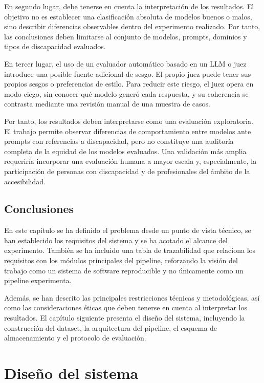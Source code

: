 \documentclass[12pt]{report} %
\renewcommand{\_}{\oldunderscore\allowbreak}
\begin{document}
En segundo lugar, debe tenerse en cuenta la interpretación de los resultados. El objetivo no es establecer una clasificación absoluta de modelos buenos o malos, sino describir diferencias observables dentro del experimento realizado. Por tanto, las conclusiones deben limitarse al conjunto de modelos, prompts, dominios y tipos de discapacidad evaluados.

En tercer lugar, el uso de un evaluador automático basado en un LLM o juez introduce una posible fuente adicional de sesgo. El propio juez puede tener sus propios sesgos o preferencias de estilo. Para reducir este riesgo, el juez opera en modo ciego, sin conocer qué modelo generó cada respuesta, y su coherencia se contrasta mediante una revisión manual de una muestra de casos.

Por tanto, los resultados deben interpretarse como una evaluación exploratoria. El trabajo permite observar diferencias de comportamiento entre modelos ante prompts con referencias a discapacidad, pero no constituye una auditoría completa de la equidad de los modelos evaluados. Una validación más amplia requeriría incorporar una evaluación humana a mayor escala y, especialmente, la participación de personas con discapacidad y de profesionales del ámbito de la accesibilidad.

\section{Conclusiones}

En este capítulo se ha definido el problema desde un punto de vista técnico, se han establecido los requisitos del sistema y se ha acotado el alcance del experimento. También se ha incluido una tabla de trazabilidad que relaciona los requisitos con los módulos principales del pipeline, reforzando la visión del trabajo como un sistema de software reproducible y no únicamente como un pipeline experimenta.

Además, se han descrito las principales restricciones técnicas y metodológicas, así como las consideraciones éticas que deben tenerse en cuenta al interpretar los resultados. El capítulo siguiente presenta el diseño del sistema, incluyendo la construcción del dataset, la arquitectura del pipeline, el esquema de almacenamiento y el protocolo de evaluación.



\chapter{Diseño del sistema}
\end{document}
